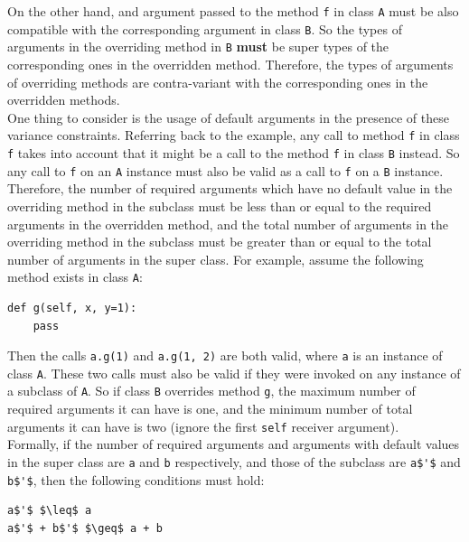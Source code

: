 On the other hand, and argument passed to the method \lstinline|f| in class \lstinline|A| must be also compatible with the corresponding argument in class \lstinline|B|. So the types of arguments in the overriding method in \lstinline|B| \textbf{must} be super types of the corresponding ones in the overridden method. Therefore, the types of arguments of overriding methods are contra-variant with the corresponding ones in the overridden methods. \\

One thing to consider is the usage of default arguments in the presence of these variance constraints. Referring back to the example, any call to method \lstinline|f| in class \lstinline|f| takes into account that it might be a call to the method \lstinline|f| in class \lstinline|B| instead. So any call to \lstinline|f| on an \lstinline|A| instance must also be valid as a call to \lstinline|f| on a \lstinline|B| instance. Therefore, the number of required arguments which have no default value in the overriding method in the subclass must be less than or equal to the required arguments in the overridden method, and the total number of arguments in the overriding method in the subclass must be greater than or equal to the total number of arguments in the super class. For example, assume the following method exists in class \lstinline|A|:
\begin{lstlisting}
def g(self, x, y=1):
	pass
\end{lstlisting}

Then the calls \lstinline|a.g(1)| and \lstinline|a.g(1, 2)| are both valid, where \lstinline|a| is an instance of class \lstinline|A|. These two calls must also be valid if they were invoked on any instance of a subclass of \lstinline|A|. So if class \lstinline|B| overrides method \lstinline|g|, the maximum number of required arguments it can have is one, and the minimum number of total arguments it can have is two (ignore the first \lstinline|self| receiver argument).\\

Formally, if the number of required arguments and arguments with default values in the super class are \lstinline|a| and \lstinline|b| respectively, and those of the subclass are \lstinline[mathescape]|a$'$| and \lstinline[mathescape]|b$'$|, then the following conditions must hold:
\begin{lstlisting}[mathescape]
a$'$ $\leq$ a 
a$'$ + b$'$ $\geq$ a + b
\end{lstlisting}

